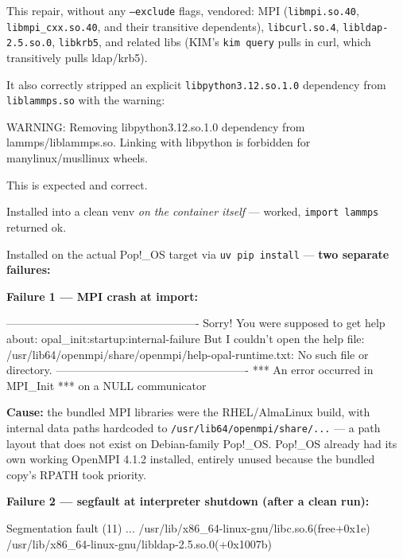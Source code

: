 \documentclass[11pt]{article}
\begin{document}

This repair, without any \texttt{--exclude} flags, vendored: MPI
(\texttt{libmpi.so.40}, \texttt{libmpi\_cxx.so.40}, and their transitive
dependents), \texttt{libcurl.so.4}, \texttt{libldap-2.5.so.0},
\texttt{libkrb5}, and related libs (KIM's \texttt{kim query} pulls in curl,
which transitively pulls ldap/krb5).

It also correctly stripped an explicit \texttt{libpython3.12.so.1.0} dependency
from \texttt{liblammps.so} with the warning:

\begin{codebox}[]
WARNING: Removing libpython3.12.so.1.0 dependency from lammps/liblammps.so.
  Linking with libpython is forbidden for manylinux/musllinux wheels.
\end{codebox}

This is expected and correct.

Installed into a clean venv \emph{on the container itself} --- worked,
\texttt{import lammps} returned ok.

Installed on the actual Pop!\_OS target via \texttt{uv pip install} ---
\textbf{two separate failures:}

\textbf{Failure 1 --- MPI crash at import:}
\begin{codebox}[]
----------------------------------------------------
Sorry! You were supposed to get help about:
   opal_init:startup:internal-failure
But I couldn't open the help file:
   /usr/lib64/openmpi/share/openmpi/help-opal-runtime.txt:
   No such file or directory.
----------------------------------------------------
*** An error occurred in MPI_Init
*** on a NULL communicator
\end{codebox}

\textbf{Cause:} the bundled MPI libraries were the RHEL/AlmaLinux build, with
internal data paths hardcoded to \texttt{/usr/lib64/openmpi/share/...} --- a
path layout that does not exist on Debian-family Pop!\_OS.  Pop!\_OS already
had its own working OpenMPI 4.1.2 installed, entirely unused because the
bundled copy's RPATH took priority.

\textbf{Failure 2 --- segfault at interpreter shutdown (after a clean run):}
\begin{codebox}[]
Segmentation fault (11)
...
/usr/lib/x86_64-linux-gnu/libc.so.6(free+0x1e)
/usr/lib/x86_64-linux-gnu/libldap-2.5.so.0(+0x1007b)
\end{codebox}
\end{document}
